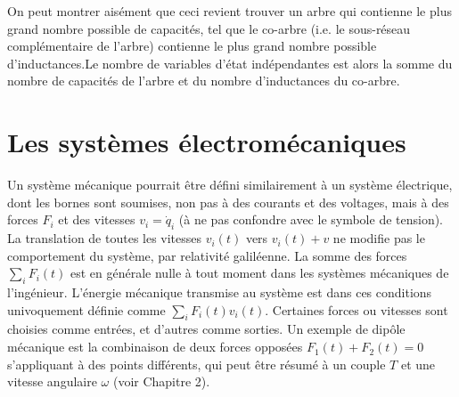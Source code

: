 
On peut montrer aisément que ceci revient trouver un arbre qui contienne  le plus grand nombre possible de capacités, tel que le co-arbre (i.e. le sous-réseau complémentaire de l'arbre) contienne le plus grand nombre possible d'inductances.Le nombre de variables d'état indépendantes est alors la somme du nombre de
capacités de l'arbre et du nombre d'inductances du co-arbre.



\section{Les systèmes électromécaniques} 

Un système mécanique pourrait être défini similairement à un système électrique, dont les bornes 
sont soumises,  non pas à des courants et des voltages, mais à des forces $F_i$ et des vitesses $v_i=\dot{q}_i$ (à ne pas confondre avec le symbole de tension).  La translation de toutes les vitesses $v_i(t)$ vers $v_i(t)+v$ ne modifie pas le comportement du système, par relativité galiléenne. La somme des forces $\sum_{i} F_i(t)$ est en générale nulle à tout moment dans les systèmes mécaniques de l'ingénieur. L'énergie mécanique transmise au système est dans ces conditions univoquement définie comme $\sum_i F_i(t) v_i(t)$.
Certaines forces ou vitesses sont choisies comme entrées, et d'autres comme sorties. Un exemple de dipôle mécanique est la combinaison de deux forces opposées $F_1(t)+F_2(t)=0$ s'appliquant à des points différents, qui peut être résumé à un couple $T$ et une vitesse angulaire $\omega$ (voir Chapitre 2).

